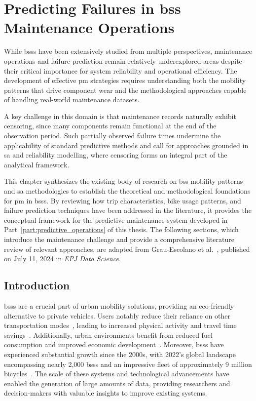 \chapter[Predicting Failures in BSS Maintenance Operations]{Predicting Failures in \ac{bss} Maintenance Operations}
\label{ch:failure_forecasting}

While \acp{bss} have been extensively studied from multiple perspectives, maintenance operations and failure prediction remain relatively underexplored areas despite their critical importance for system reliability and operational efficiency. The development of effective \ac{pm} strategies requires understanding both the mobility patterns that drive component wear and the methodological approaches capable of handling real-world maintenance datasets.

A key challenge in this domain is that maintenance records naturally exhibit censoring, since many components remain functional at the end of the observation period. Such partially observed failure times undermine the applicability of standard predictive methods and call for approaches grounded in \ac{sa} and reliability modelling, where censoring forms an integral part of the analytical framework.

This chapter synthesizes the existing body of research on \ac{bss} mobility patterns and \ac{sa} methodologies to establish the theoretical and methodological foundations for \ac{pm} in \acp{bss}. By reviewing how trip characteristics, bike usage patterns, and failure prediction techniques have been addressed in the literature, it provides the conceptual framework for the predictive maintenance system developed in Part~\ref{part:predictive_operations} of this thesis. The following sections, which introduce the maintenance challenge and provide a comprehensive literature review of relevant approaches, are adapted from Grau-Escolano et al.~\cite{Grau-Escolano2024}, published on July 11, 2024 in \textit{EPJ Data Science}.

\section{Introduction}

\acp{bss} are a crucial part of urban mobility solutions, providing an eco-friendly alternative to private vehicles. Users notably reduce their reliance on other transportation modes~\cite{Ma2020}, leading to increased physical activity and travel time savings~\cite{Qiu2018}. Additionally, urban environments benefit from reduced fuel consumption and improved economic development~\cite{Qiu2018}. Moreover, \acp{bss} have experienced substantial growth since the 2000s, with 2022's global landscape encompassing nearly 2,000 \acp{bss} and an impressive fleet of approximately 9 million bicycles~\cite{MeddinWorldMapReport2022}. The scale of these systems and technological advancements have enabled the generation of large amounts of data, providing researchers and decision-makers with valuable insights to improve existing systems.

